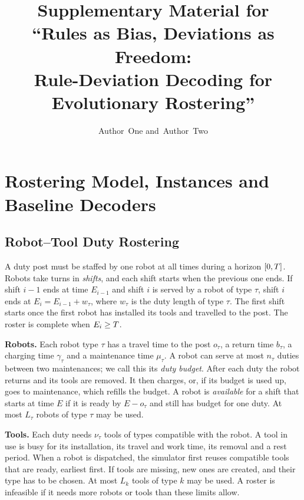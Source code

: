 \documentclass[journal]{IEEEtran}
\title{Supplementary Material for\\ ``Rules as Bias, Deviations as Freedom:\\ Rule-Deviation Decoding for Evolutionary Rostering''}
\author{Author~One and~Author~Two}
\begin{document}
\maketitle


\section{Rostering Model, Instances and Baseline Decoders}
\label{sec:s-model}

\subsection{Robot--Tool Duty Rostering}
\label{sec:problem:model}

A duty post must be staffed by one robot at all times during a horizon $[0,T]$.
Robots take turns in \emph{shifts}, and each shift starts when the previous one ends.
If shift $i-1$ ends at time $E_{i-1}$ and shift $i$ is served by a robot of type $\tau$,
shift $i$ ends at $E_i = E_{i-1} + w_\tau$, where $w_\tau$ is the duty length of type $\tau$.
The first shift starts once the first robot has installed its tools and travelled to the post.
The roster is complete when $E_i \ge T$.

\textbf{Robots.}
Each robot type $\tau$ has a travel time to the post $o_\tau$, a return time $b_\tau$, a charging time $\gamma_\tau$ and a maintenance time $\mu_\tau$.
A robot can serve at most $n_\tau$ duties between two maintenances; we call this its \emph{duty budget}.
After each duty the robot returns and its tools are removed.
It then charges, or, if its budget is used up, goes to maintenance, which refills the budget.
A robot is \emph{available} for a shift that starts at time $E$ if it is ready by $E - o_\tau$ and still has budget for one duty.
At most $L_\tau$ robots of type $\tau$ may be used.

\textbf{Tools.}
Each duty needs $\nu_\tau$ tools of types compatible with the robot.
A tool in use is busy for its installation, its travel and work time, its removal and a rest period.
When a robot is dispatched, the simulator first reuses compatible tools that are ready, earliest first.
If tools are missing, new ones are created, and their type has to be chosen.
At most $L_k$ tools of type $k$ may be used.
A roster is infeasible if it needs more robots or tools than these limits allow.
\end{document}
